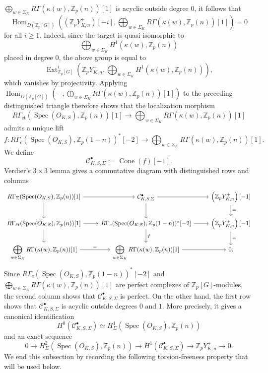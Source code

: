 \documentclass[a4paper,11pt]{article}
\begin{document}
\(
\bigoplus_{w\in\Sigma_K}R\Gamma(\kappa(w),\mathbb Z_p(n))[1]
\)
is acyclic outside degree \(0\), it follows that
\[
\operatorname{Hom}_{D(\mathbb Z_p[G])}
\left(
\left(\mathbb Z_pY_{K,n}^{+}\right)[-i],
\bigoplus_{w\in\Sigma_K}R\Gamma(\kappa(w),\mathbb Z_p(n))[1]
\right)
=0
\]
for all \(i\geq 1\). Indeed, since the target is quasi-isomorphic to
\[
\bigoplus_{w\in\Sigma_K}H^1(\kappa(w),\mathbb Z_p(n))
\]
placed in degree \(0\), the above group is equal to
\[
\operatorname{Ext}^{i}_{\mathbb Z_p[G]}
\left(
\mathbb{Z}_pY_{K,n}^{+},
\bigoplus_{w\in\Sigma_K}H^1(\kappa(w),\mathbb Z_p(n))
\right),
\]
which vanishes by projectivity.
Applying
\(
\operatorname{Hom}_{D(\mathbb Z_p[G])}
\left(
-,
\bigoplus_{w\in\Sigma_K}R\Gamma(\kappa(w),\mathbb Z_p(n))[1]
\right)
\)
to the preceding distinguished triangle therefore shows that the localization
morphism 
\[
R\Gamma_{\mathrm{\acute{e}t}}(\operatorname{Spec}(O_{K,S}),\mathbb Z_p(n))[1]
\longrightarrow
\bigoplus_{w\in\Sigma_K}R\Gamma(\kappa(w),\mathbb Z_p(n))[1]
\]
admits a unique lift
\[
f\colon
R\Gamma_c(\operatorname{Spec}(O_{K,S}),\mathbb Z_p(1-n))^*[-2]
\longrightarrow
\bigoplus_{w\in\Sigma_K}R\Gamma(\kappa(w),\mathbb Z_p(n))[1].
\]
We define
\[
\mathcal C_{K,S,\Sigma}^{\bullet}
:=
\operatorname{Cone}(f)[-1].
\]
Verdier's $3\times 3$ lemma gives a commutative diagram with
distinguished rows and columns
\[
\begin{tikzcd}
R\Gamma_{\Sigma}(\operatorname{Spec}(O_{K,S}), \mathbb Z_p(n))[1]
\arrow[r]
\arrow[d]
&
\mathcal C_{K,S,\Sigma}^{\bullet}
\arrow[r]
\arrow[d]
&
\left(\mathbb{Z}_pY_{K,n}^{+}\right)[-1]
\arrow[d, "="]
\\
R\Gamma_{\mathrm{\acute{e}t}}(\operatorname{Spec}(O_{K,S}),\mathbb Z_p(n))[1]
\arrow[r]
\arrow[d]
&
R\Gamma_c(\operatorname{Spec}(O_{K,S}),\mathbb Z_p(1-n))^*[-2]
\arrow[r]
\arrow[d, "f"]
&
\left(\mathbb{Z}_pY_{K,n}^{+}\right)[-1]
\arrow[d, "="]
\\
\displaystyle\bigoplus_{w\in\Sigma_K}R\Gamma(\kappa(w),\mathbb Z_p(n))[1]
\arrow[r, "="]
&
\displaystyle\bigoplus_{w\in\Sigma_K}R\Gamma(\kappa(w),\mathbb Z_p(n))[1]
\arrow[r]
&
0.
\end{tikzcd}
\]
Since
\(
R\Gamma_c(\operatorname{Spec}(O_{K,S}),\mathbb Z_p(1-n))^*[-2]
\)
and
\(
\bigoplus_{w\in\Sigma_K}R\Gamma(\kappa(w),\mathbb Z_p(n))[1]
\)
are perfect complexes of $\mathbb Z_p[G]$-modules, the second column shows that
$\mathcal C_{K,S,\Sigma}^{\bullet}$ is perfect. On the other hand, the first
row shows that $\mathcal C_{K,S,\Sigma}^{\bullet}$ is acyclic outside degrees
$0$ and $1$. More precisely, it gives a canonical identification
\[
H^0(\mathcal C_{K,S,\Sigma}^{\bullet})
\simeq
H^1_{\Sigma}(\operatorname{Spec}(O_{K,S}),\mathbb Z_p(n))
\]
and an exact sequence
\[
0\to
H^2_{\Sigma}(\operatorname{Spec}(O_{K,S}),\mathbb Z_p(n))
\to
H^1(\mathcal C_{K,S,\Sigma}^{\bullet})
\to
\mathbb{Z}_pY_{K,n}^{+}
\to 0.
\]
We end this subsection by recording the following torsion-freeness property that will be used below.
\end{document}
